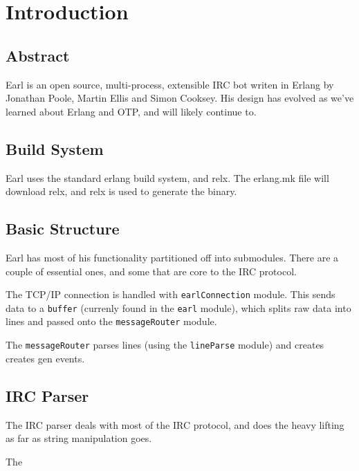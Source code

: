 \documentclass[12pt]{article}
\begin{document}

\section*{Introduction}

\subsection*{Abstract}

Earl is an open source, multi-process, extensible IRC bot writen in Erlang by
Jonathan Poole, Martin Ellis and Simon Cooksey.  His design has evolved as we've
learned about Erlang and OTP, and will likely continue to.

\subsection*{Build System}

Earl uses the standard erlang build system, and relx. The erlang.mk file will
download relx, and relx is used to generate the binary.


\subsection*{Basic Structure}

Earl has most of his functionality partitioned off into submodules. There are a
couple of essential ones, and some that are core to the IRC protocol.

The TCP/IP connection is handled with \texttt{earlConnection} module. This sends
data to a \texttt{buffer} (currenly found in the \texttt{earl} module), which
splits raw data into lines and passed onto the \texttt{messageRouter} module.

The \texttt{messageRouter} parses lines (using the \texttt{lineParse} module)
and creates creates gen events.

\subsection*{IRC Parser}

The IRC parser deals with most of the IRC protocol, and does the heavy lifting
as far as string manipulation goes.

The
\end{document}
